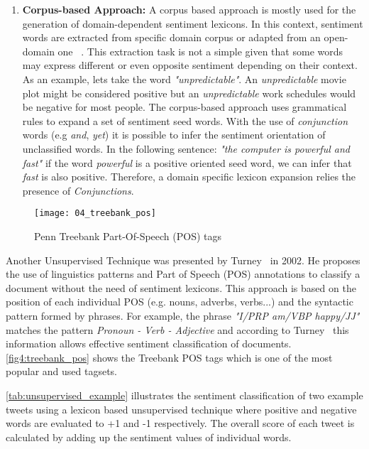 {\begin{enumerate}
\item \textbf{Corpus-based Approach:} A corpus based approach is mostly used for the generation of domain-dependent sentiment lexicons. In this context, sentiment words are extracted from specific domain corpus or adapted from an open-domain one ~\cite[p. 82]{liu2012sentiment}. This extraction task is not a simple given that some words may express different or even opposite sentiment depending on their context. As an example, lets take the word  \textit{"unpredictable"}. An \textit{unpredictable} movie plot might be considered positive but an \textit{unpredictable} work schedules would be negative for most people. The corpus-based approach uses grammatical rules to expand a set of sentiment seed words. With the use of \textit{conjunction} words (e.g \textit{and}, \textit{yet}) it is possible to infer the sentiment orientation of unclassified words. In the following sentence: \textit{"the computer is powerful and fast"} if the word \textit{powerful} is a positive oriented seed word, we can infer that \textit{fast} is also positive. Therefore, a domain specific lexicon expansion relies the presence of \textit{Conjunctions}.

\end{enumerate}

\begin{figure}
    \centering
    \caption[Penn Treebank Part-Of-Speech (POS) tags]{Penn Treebank Part-Of-Speech (POS) tags{~\cite[p. 33]{liu2012sentiment}}}
    \texttt{[image: 04\_treebank\_pos]}
    \label{fig4:treebank_pos}
\end{figure}



Another Unsupervised Technique was presented by Turney~\cite{turney2002thumbs} in 2002. He proposes the use of linguistics patterns and Part of Speech (POS) annotations to classify a document without the need of sentiment lexicons. This approach is based on the position of each individual POS (e.g. nouns, adverbs, verbs...) and the syntactic pattern formed by phrases. For example, the phrase \textit{"I/PRP am/VBP happy/JJ"} matches the pattern \textit{Pronoun - Verb - Adjective} and according to Turney~\cite{turney2002thumbs} this information allows effective sentiment classification of documents. \autoref{fig4:treebank_pos} shows the Treebank POS tags which is one of the most popular and used tagsets. 

\autoref{tab:unsupervised_example} illustrates the sentiment classification of two example tweets using a lexicon based unsupervised technique where positive and negative words are evaluated to +1 and -1 respectively. The overall score of each tweet is calculated by adding up the sentiment values of individual words.

}
